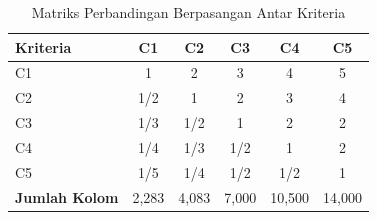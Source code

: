 \begin{table}[h]
\centering
\caption{Matriks Perbandingan Berpasangan Antar Kriteria}
\label{tab:ahp-kriteria}
\begin{tabular}{|l|c|c|c|c|c|}
\hline
\textbf{Kriteria} & \textbf{C1} & \textbf{C2} & \textbf{C3} & \textbf{C4} & \textbf{C5} \\
\hline
C1 & 1     & 2     & 3     & 4     & 5     \\
C2 & 1/2   & 1     & 2     & 3     & 4     \\
C3 & 1/3   & 1/2   & 1     & 2     & 2     \\
C4 & 1/4   & 1/3   & 1/2   & 1     & 2     \\
C5 & 1/5   & 1/4   & 1/2   & 1/2   & 1     \\
\hline
\textbf{Jumlah Kolom} & 2,283 & 4,083 & 7,000 & 10,500 & 14,000 \\
\hline
\end{tabular}
\end{table}